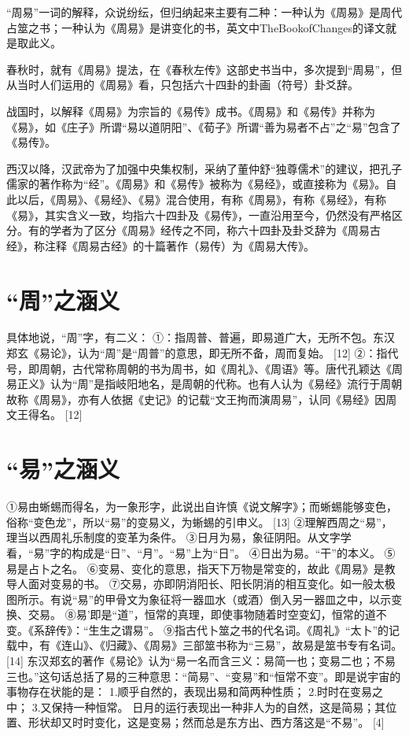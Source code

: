 \documentclass[12pt,UTF8]{ctexbook}
\begin{document}
“周易”一词的解释，众说纷纭，但归纳起来主要有二种：一种认为《周易》是周代占筮之书；一种认为《周易》是讲变化的书，英文中TheBookofChanges的译文就是取此义。

春秋时，就有《周易》提法，在《春秋左传》这部史书当中，多次提到“周易”，但从当时人们运用的《周易》看，只包括六十四卦的卦画（符号）卦爻辞。

战国时，以解释《周易》为宗旨的《易传》成书。《周易》和《易传》并称为《易》，如《庄子》所谓“易以道阴阳”、《荀子》所谓“善为易者不占”之“易”包含了《易传》。

西汉以降，汉武帝为了加强中央集权制，采纳了董仲舒“独尊儒术”的建议，把孔子儒家的著作称为“经”。《周易》和《易传》被称为《易经》，或直接称为《易》。自此以后，《周易》、《易经》、《易》混合使用，有称《周易》，有称《易经》，有称《易》，其实含义一致，均指六十四卦及《易传》，一直沿用至今，仍然没有严格区分。有的学者为了区分《周易》经传之不同，称六十四卦及卦爻辞为《周易古经》，称注释《周易古经》的十篇著作（易传）为《周易大传》。

\section{“周”之涵义}

具体地说，“周”字，有二义：
①：指周普、普遍，即易道广大，无所不包。东汉郑玄《易论》，认为“周”是“周普”的意思，即无所不备，周而复始。 [12]
②：指代号，即周朝，古代常称周朝的书为周书，如《周礼》、《周语》等。唐代孔颖达《周易正义》认为“周”是指岐阳地名，是周朝的代称。也有人认为《易经》流行于周朝故称《周易》，亦有人依据《史记》的记载“文王拘而演周易”，认同《易经》因周文王得名。 [12]

\section{“易”之涵义}

①易由蜥蜴而得名，为一象形字，此说出自许慎《说文解字》；而蜥蜴能够变色，俗称“变色龙”，所以“易”的变易义，为蜥蜴的引申义。 [13]
②理解西周之“易”，理当以西周礼乐制度的变革为条件。
③日月为易，象征阴阳。从文字学看，“易”字的构成是“日”、“月”。“易”上为“日”。
④日出为易。“干”的本义。
⑤易是占卜之名。
⑥变易、变化的意思，指天下万物是常变的，故此《周易》是教导人面对变易的书。
⑦交易，亦即阴消阳长、阳长阴消的相互变化。如一般太极图所示。有说“易”的甲骨文为象征将一器皿水（或酒）倒入另一器皿之中，以示变换、交易。
⑧易’即是“道”，恒常的真理，即使事物随着时空变幻，恒常的道不变。《系辞传》：“生生之谓易”。
⑨指古代卜筮之书的代名词。《周礼》“太卜”的记载中，有《连山》、《归藏》、《周易》三部筮书称为“三易”，故易是筮书专有名词。 [14]
东汉郑玄的著作《易论》认为“易一名而含三义：易简一也；变易二也；不易三也。”这句话总括了易的三种意思：“简易”、“变易”和“恒常不变”。即是说宇宙的事物存在状能的是：
1.顺乎自然的，表现出易和简两种性质；
2.时时在变易之中；
3.又保持一种恒常。
日月的运行表现出一种非人为的自然，这是简易；其位置、形状却又时时变化，这是变易；然而总是东方出、西方落这是“不易”。 [4]
\end{document}
